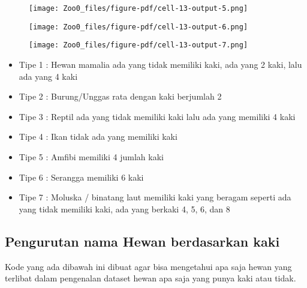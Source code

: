 \documentclass[
  letterpaper,
]{krantz}
\providecommand{\tightlist}{%
  \setlength{\itemsep}{0pt}\setlength{\parskip}{0pt}}\usepackage{longtable,booktabs,array}
\begin{document}
\begin{figure}[H]

{\centering \texttt{[image: Zoo0\_files/figure-pdf/cell-13-output-5.png]}

}

\end{figure}

\begin{figure}[H]

{\centering \texttt{[image: Zoo0\_files/figure-pdf/cell-13-output-6.png]}

}

\end{figure}

\begin{figure}[H]

{\centering \texttt{[image: Zoo0\_files/figure-pdf/cell-13-output-7.png]}

}

\end{figure}

\begin{itemize}
\tightlist
\item
  Tipe 1 : Hewan mamalia ada yang tidak memiliki kaki, ada yang 2 kaki,
  lalu ada yang 4 kaki
\item
  Tipe 2 : Burung/Unggas rata dengan kaki berjumlah 2
\item
  Tipe 3 : Reptil ada yang tidak memiliki kaki lalu ada yang memiliki 4
  kaki
\item
  Tipe 4 : Ikan tidak ada yang memiliki kaki
\item
  Tipe 5 : Amfibi memiliki 4 jumlah kaki
\item
  Tipe 6 : Serangga memiliki 6 kaki
\item
  Tipe 7 : Moluska / binatang laut memiliki kaki yang beragam seperti
  ada yang tidak memiliki kaki, ada yang berkaki 4, 5, 6, dan 8
\end{itemize}

\hypertarget{pengurutan-nama-hewan-berdasarkan-kaki}{%
\subsection{Pengurutan nama Hewan berdasarkan
kaki}\label{pengurutan-nama-hewan-berdasarkan-kaki}}

Kode yang ada dibawah ini dibuat agar bisa mengetahui apa saja hewan
yang terlibat dalam pengenalan dataset hewan apa saja yang punya kaki
atau tidak.
\end{document}
